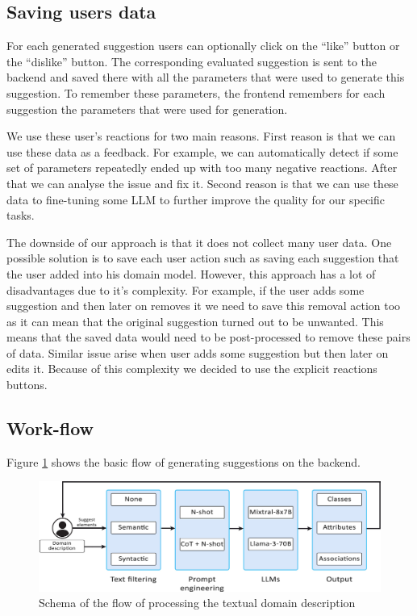 \subsection{Saving users data}

For each generated suggestion users can optionally click on the ``like'' button or the ``dislike'' button. The corresponding evaluated suggestion is sent to the backend and saved there with all the parameters that were used to generate this suggestion. To remember these parameters, the frontend remembers for each suggestion the parameters that were used for generation.

We use these user's reactions for two main reasons. First reason is that we can use these data as a feedback. For example, we can automatically detect if some set of parameters repeatedly ended up with too many negative reactions. After that we can analyse the issue and fix it. Second reason is that we can use these data to fine-tuning some LLM to further improve the quality for our specific tasks.

The downside of our approach is that it does not collect many user data. One possible solution is to save each user action such as saving each suggestion that the user added into his domain model. However, this approach has a lot of disadvantages due to it's complexity. For example, if the user adds some suggestion and then later on removes it we need to save this removal action too as it can mean that the original suggestion turned out to be unwanted. This means that the saved data would need to be post-processed to remove these pairs of data. Similar issue arise when user adds some suggestion but then later on edits it. Because of this complexity we decided to use the explicit reactions buttons.


\subsection{Work-flow}

Figure \ref{fig:work-flow} shows the basic flow of generating suggestions on the backend.

\begin{figure}[!h]
    \centering
    \includegraphics[scale=0.23]{img/work-flow.jpg}
    \caption{\centering Schema of the flow of processing the textual domain description}
    \label{fig:work-flow}
\end{figure}


